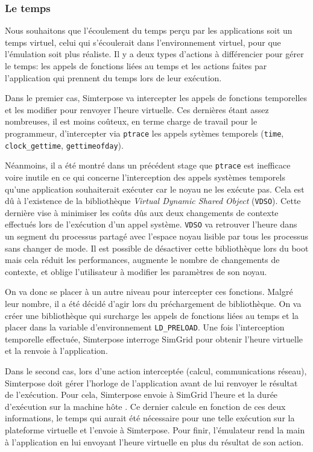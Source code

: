 \subsubsection{Le temps}
\label{subsubsection:time}

Nous souhaitons que l'écoulement du temps perçu par les applications soit un
temps virtuel, celui qui s'écoulerait dans l'environnement virtuel, pour que
l'émulation soit plus réaliste. Il y a deux types d'actions à différencier pour
gérer le temps: les appels de fonctions liées au temps et les actions faites par
l'application qui prennent du temps lors de leur exécution.

Dans le premier cas, Simterpose va intercepter les appels de fonctions
temporelles et les modifier pour renvoyer l'heure virtuelle. Ces dernières étant
assez nombreuses, il est moins coûteux, en terme charge de travail pour
le programmeur, d'intercepter via
\texttt{ptrace} les appels sytèmes temporels (\texttt{time},
\texttt{clock\_gettime}, \texttt{gettimeofday}).

Néanmoins, il a été montré dans un précédent stage
\citep{CHLOE:Emulationapplicationdistribuees} que \texttt{ptrace} est inefficace
voire inutile en ce qui concerne l'interception des appels systèmes temporels
qu'une application souhaiterait exécuter car le noyau ne les exécute pas. Cela
est dû à l'existence de la bibliothèque \textit{Virtual Dynamic Shared Object}
(\texttt{VDSO}). Cette dernière vise à minimiser les coûts dûs aux deux changements de contexte effectués lors de l'exécution d'un appel système. \texttt{VDSO} va retrouver l'heure dans un segment du processus partagé avec l'espace noyau lisible par tous les processus sans changer de mode. Il est possible de désactiver cette bibliothèque lors du boot mais cela réduit les performances, augmente le nombre de changements de contexte, et oblige l'utilisateur à modifier les paramètres de son noyau.

On va donc se placer à un autre niveau pour intercepter ces fonctions. Malgré
leur nombre, il a été décidé d'agir lors du préchargement de bibliothèque. On va
créer une bibliothèque qui surcharge les appels de fonctions liées au temps et
la placer dans la variable d'environnement \texttt{LD\_PRELOAD}. Une fois l'interception temporelle effectuée,
Simterpose interroge SimGrid pour obtenir l'heure virtuelle et la renvoie à
l'application.

Dans le second cas, lors d'une action interceptée (calcul, communications
réseau), Simterpose doit gérer l'horloge de l'application avant de lui renvoyer
le résultat de l'exécution. Pour cela, Simterpose envoie à SimGrid l'heure et la
durée d'exécution sur la machine hôte . Ce dernier calcule en fonction de ces
deux informations, le temps qui aurait été nécessaire pour une telle exécution
sur la plateforme virtuelle et l'envoie à Simterpose. Pour finir, l'émulateur
rend la main à l'application en lui envoyant l'heure virtuelle en plus du
résultat de son action.
